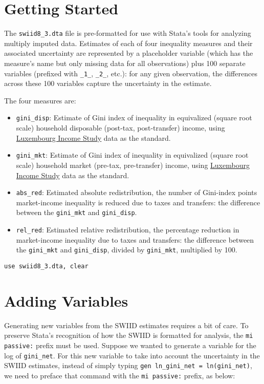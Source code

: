 \documentclass[11pt]{article}
\begin{document}
\section{Getting Started}
The \verb+swiid8_3.dta+ file is pre-formatted for use with Stata's tools for analyzing multiply imputed data.  Estimates of each of four inequality measures and their associated uncertainty are represented by a placeholder variable (which has the measure's name but only missing data for all observations) plus 100 separate variables (prefixed with \verb+_1_+, \verb+_2_+, etc.): for any given observation, the differences across these 100 variables capture the uncertainty in the estimate.   

The four measures are:
\begin{itemize}
	\item \verb+gini_disp+: Estimate of Gini index of inequality in equivalized (square root scale) household disposable (post-tax, post-transfer) income, using \href{http://www.lisdatacenter.org}{Luxembourg Income Study} data as the standard.
	\item \verb+gini_mkt+: Estimate of Gini index of inequality in equivalized (square root scale) household market (pre-tax, pre-transfer) income, using \href{http://www.lisdatacenter.org}{Luxembourg Income Study} data as the standard.	
	\item \verb+abs_red+: Estimated absolute redistribution, the number of Gini-index points market-income inequality is reduced due to taxes and transfers: the difference between the \verb+gini_mkt+ and \verb+gini_disp+.
	\item \verb+rel_red+: Estimated relative redistribution, the percentage reduction in market-income inequality due to taxes and transfers: the difference between the \verb+gini_mkt+ and \verb+gini_disp+, divided by \verb+gini_mkt+, multiplied by 100.
\end{itemize}

\begin{verbatim}
use swiid8_3.dta, clear
\end{verbatim}

\section{Adding Variables}
Generating new variables from the SWIID estimates requires a bit of care.  To preserve Stata's recognition of how the SWIID is formatted for analysis, the \verb+mi passive:+ prefix must be used.  Suppose we wanted to generate a variable for the log of \verb+gini_net+.  For this new variable to take into account the uncertainty in the SWIID estimates, instead of simply typing \verb+gen ln_gini_net = ln(gini_net)+, we need to preface that command with the \verb+mi passive:+ prefix, as below:
\end{document}
